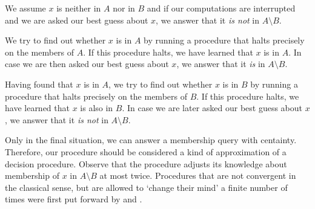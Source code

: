 \begin{codelisting}
\item
  We assume $x$ is neither in $A$ nor in $B$ and if our computations are interrupted and we are asked our best guess about $x$, we answer that it \emph{is not} in $A \setminus B$.
\item
  We try to find out whether $x$ is in $A$ by running a procedure that halts precisely on the members of $A$.
  If this procedure halts, we have learned that $x$ is in $A$.
  In case we are then asked our best guess about $x$, we answer that it \emph{is} in $A \setminus B$.
\item
  Having found that $x$ is in $A$, we try to find out whether $x$ is in $B$ by running a procedure that halts precisely on the members of $B$.
  If this procedure halts, we have learned that $x$ is also in $B$.
  In case we are later asked our best guess about $x$, we answer that it \emph{is not} in $A \setminus B$.
\end{codelisting}
Only in the final situation, we can answer a membership query with centainty.
Therefore, our procedure should be considered a kind of approximation of a decision procedure.
Observe that the procedure adjusts its knowledge about membership of $x$ in $A \setminus B$ at most twice.
Procedures that are not convergent in the classical sense, but are allowed to `change their mind' a finite number of times were first put forward by \textcite{putnam1965trial} and \textcite{gold1965limiting}.

